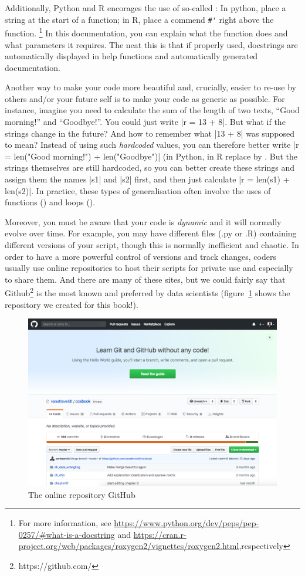 Additionally, Python and R encorages the use of so-called :
In python, place a string at the start of a function; in R, place a commend \verb|#'| right above the function.
\footnote{For more information, see \url{https://www.python.org/dev/peps/pep-0257/\#what-is-a-docstring} and \url{https://cran.r-project.org/web/packages/roxygen2/vignettes/roxygen2.html},respectively}
In this documentation, you can explain what the function does and what parameters it requires. 
The neat this is that if properly used, docstrings are automatically displayed in help functions and automatically generated documentation.

Another way to make your code more beautiful and, crucially, easier to re-use by others and/or your future self is to make your code as generic as possible. For instance, imagine you need to calculate the sum of the length of two texts, ``Good morning!'' and ``Goodbye!''. You could just write |r = 13 + 8|. But what if the strings change in the future? And how to remember what |13 + 8| was supposed to mean? Instead of using such \emph{hardcoded} values, you can therefore better write |r = len("Good morning!") + len("Goodbye")| (in Python, in R replace  by . But the strings themselves are still hardcoded, so you can better create these strings and assign them the names |s1| and |s2| first, and then just calculate |r = len(s1) + len(s2)|. In practice, these types of generalisation often involve the uses of functions () and loops ().

Moreover, you must be aware that your code is \textit{dynamic} and it will normally evolve over time. For example, you may have different files (.py or .R) containing different versions of your script, though this is normally inefficient and chaotic. In order to have a more powerful control of versions and track changes, coders usually use online repositories to host their scripts for private use and especially to share them. And there are many of these sites, but we could fairly say that Github\footnote{https://github.com/} is the most known and preferred by data scientists (figure~\ref{fig:github} shows the repository we created for this book!).

\begin{figure}
\centering
\includegraphics[width=0.9\linewidth]{figures/ch04_github}
\caption{The online repository GitHub}
\label{fig:github}
\end{figure}
 
